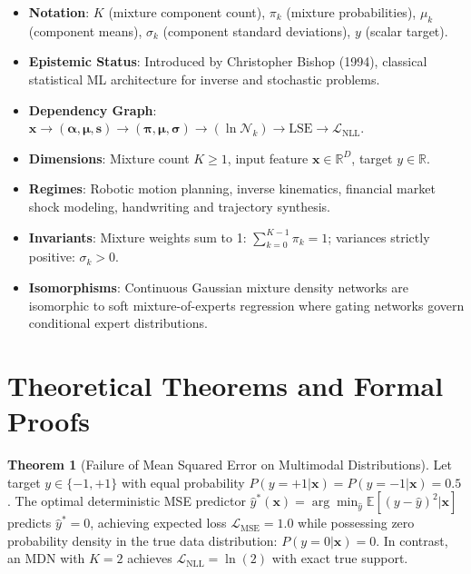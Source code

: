 \documentclass[11pt,a4paper]{article}
\theoremstyle{definition}
\newtheorem{theorem}{\textbf{Theorem}}[section]
\begin{document}
\begin{itemize}
    \item \textbf{Notation}: $K$ (mixture component count), $\pi_k$ (mixture probabilities), $\mu_k$ (component means), $\sigma_k$ (component standard deviations), $y$ (scalar target).
    \item \textbf{Epistemic Status}: Introduced by Christopher Bishop (1994), classical statistical ML architecture for inverse and stochastic problems.
    \item \textbf{Dependency Graph}: $\mathbf{x} \to (\boldsymbol{\alpha}, \boldsymbol{\mu}, \mathbf{s}) \to (\boldsymbol{\pi}, \boldsymbol{\mu}, \boldsymbol{\sigma}) \to (\ln \mathcal{N}_k) \to \text{LSE} \to \mathcal{L}_{\text{NLL}}$.
    \item \textbf{Dimensions}: Mixture count $K \ge 1$, input feature $\mathbf{x} \in \mathbb{R}^D$, target $y \in \mathbb{R}$.
    \item \textbf{Regimes}: Robotic motion planning, inverse kinematics, financial market shock modeling, handwriting and trajectory synthesis.
    \item \textbf{Invariants}: Mixture weights sum to 1: $\sum_{k=0}^{K-1} \pi_k = 1$; variances strictly positive: $\sigma_k > 0$.
    \item \textbf{Isomorphisms}: Continuous Gaussian mixture density networks are isomorphic to soft mixture-of-experts regression where gating networks govern conditional expert distributions.
\end{itemize}

\section{Theoretical Theorems and Formal Proofs}

\begin{theorem}[Failure of Mean Squared Error on Multimodal Distributions]
Let target $y \in \{-1, +1\}$ with equal probability $P(y = +1 | \mathbf{x}) = P(y = -1 | \mathbf{x}) = 0.5$. The optimal deterministic MSE predictor $\hat{y}^*(\mathbf{x}) = \arg\min_{\hat{y}} \mathbb{E}[(y - \hat{y})^2 | \mathbf{x}]$ predicts $\hat{y}^* = 0$, achieving expected loss $\mathcal{L}_{\text{MSE}} = 1.0$ while possessing zero probability density in the true data distribution: $P(y = 0 | \mathbf{x}) = 0$. In contrast, an MDN with $K=2$ achieves $\mathcal{L}_{\text{NLL}} = \ln(2)$ with exact true support.
\end{theorem}
\end{document}
